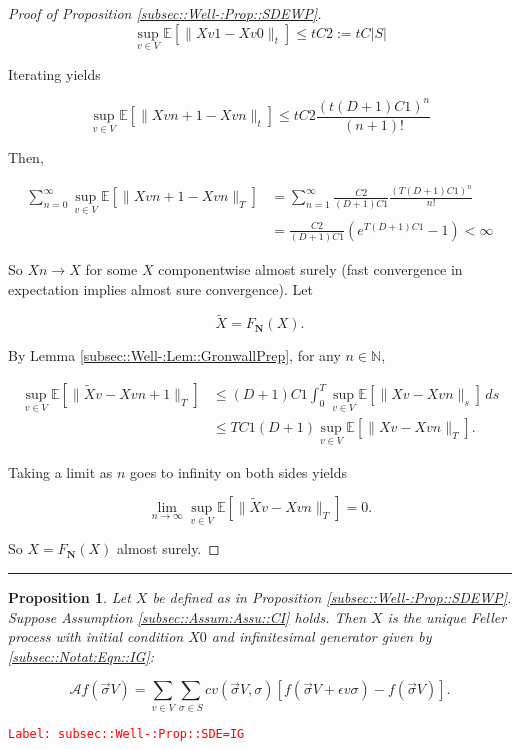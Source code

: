 \documentclass[12pt]{article}
\newcommand{\mb}{\mathbb}
\newcommand{\mc}{\mathcal}
\newcommand{\ra}{\rightarrow}
\newcommand{\ep}{\epsilon}
\newcommand{\tr}{\textcolor{red}}
\newcommand{\labe}[1]{\tr{\texttt{Label: #1}}}
\newcommand{\lin}{\rule{\linewidth}{0.4 pt}}
\newcommand{\ex}[1]{\mb{E}\left[#1\right]}			%
\newcommand{\defeq}{:=}								%
\renewcommand{\v}{v}							%
\renewcommand{\S}{S}							%
\newcommand{\s}{\sigma}							%
\newcommand{\sv}{\vec{\s}}						%
\newcommand{\ev}{\ep}							%
\newcommand{\T}{T}								%
\renewcommand{\t}{t}							%
\renewcommand{\tt}{s}							%
\newcommand{\X}{X}								%
\newcommand{\IG}{\mc{A}}						%
\newcommand{\IGr}{c}							%
\newcommand{\const}{C}							%
\newcommand{\degr}{D}							%
\newcommand{\poisses}{\mathbf{N}}				%
\newcommand{\Fpo}{F_{\poisses}}					%
\newcommand{\alt}[1]{\widetilde{#1}}			%
\newtheorem{prop}[thms]{Proposition}
\begin{document}
\begin{proof}[Proof of Proposition \ref{subsec::Well-:Prop::SDEWP}]
\[\sup_{\v \in  V}\ex{\|\X{\v}{}{1} - \X{\v}{}{0}\|_\t} \leq \t\const{2} \defeq \t\const{}|\S|\]

Iterating yields

\[\sup_{\v \in  V} \ex{\|\X{\v}{}{n+1} - \X{\v}{}{n}\|_\t} \leq \t\const{2}\frac{(\t(\degr+1)\const{1})^n}{(n+1)!}\]

Then,

\begin{align*}
\sum_{n=0}^\infty \sup_{\v \in  V} \ex{\|\X{\v}{}{n+1} - \X{\v}{}{n}\|_\T} &= \sum_{n=1}^\infty \frac{\const{2}}{(\degr+1)\const{1}}\frac{(\T(\degr+1)\const{1})^{n}}{n !}\\
& = \frac{\const{2}}{(\degr+1)\const{1}}(e^{\T(\degr+1)\const{1}} - 1) < \infty
\end{align*}


So \(\X{}{}{n} \ra \X{}{}\) for some \(\X{}{}\) componentwise almost surely (fast convergence in expectation implies almost sure convergence). Let 

\[\alt{\X}{{}{}} = \Fpo(\X{}{}).\]

By Lemma \ref{subsec::Well-:Lem::GronwallPrep}, for any \(n\in\mb{N}\),

\begin{align*}
\sup_{\v \in  V} \ex{\|\alt{\X}{{\v}{}} - \X{\v}{}{n+1}\|_\T} &\leq (\degr+1)\const{1}\int_0^\T \sup_{\v \in  V}\ex{\|\X{\v}{} - \X{\v}{}{n}\|_\tt}\,d\tt \\
&\leq \T\const{1}(\degr+1)\sup_{\v\in  V} \ex{\|\X{\v}{} - \X{\v}{}{n}\|_\T}.
\end{align*}

Taking a limit as \(n\) goes to infinity on both sides yields

\[\lim_{n\ra\infty} \sup_{\v \in  V} \ex{\|\alt{\X}{{\v}{}} - \X{\v}{}{n}\|_\T} = 0.\]

So \(\X{}{}= \Fpo(\X{}{})\) almost surely.
\end{proof}

\lin

\begin{prop}
Let \(\X{}{}\) be defined as in Proposition \ref{subsec::Well-:Prop::SDEWP}. Suppose Assumption \ref{subsec::Assum:Assu::CI} holds. Then \(\X{}{}\) is the unique Feller process with initial condition \(\X{}{0}\) and infinitesimal generator given by \eqref{subsec::Notat:Eqn::IG}:

\[\IG f(\sv{}{ V}) = \sum_{\v\in  V}\sum_{\s \in \S} \IGr{\v}(\sv{}{ V},\s)[f(\sv{}{ V} + \ev{\v}\s) - f(\sv{}{ V})].\]
\label{subsec::Well-:Prop::SDE=IG}
\end{prop}
\labe{subsec::Well-:Prop::SDE=IG}
\end{document}
